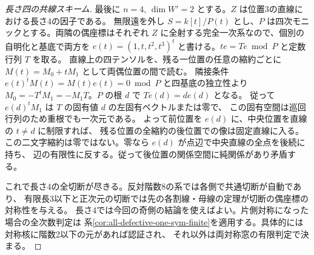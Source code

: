 \begin{proof}[長さ四の共線スキーム]
最後に $n=4$, $\dim W'=2$ とする。$Z$ は位置3の直線における長さ4の因子である。
無限遠を外し $S=k[t]/P(t)$ とし、$P$ は四次モニックとする。両隣の偶座標はそれぞれ
$Z$ に全射する完全一次系なので、個別の自明化と基底で両方を
$e(t)=(1,t,t^2,t^3)^t$ と書ける。$t e=T e\bmod P$ と定数行列 $T$ を取る。
直線上の四テンソルを、残る一位置の任意の縮約ごとに $M(t)=M_0+tM_1$ として両偶位置の間で読む。
隣接条件 $e(t)^t M(t)=M(t)e(t)=0\bmod P$ と四基底の独立性より
$M_0=-T^t M_1=-M_1T$。$P$ の根 $d$ で $Te(d)=d e(d)$ となる。
従って $e(d)^t M_1$ は $T$ の固有値 $d$ の左固有ベクトルまたは零で、
この固有空間は巡回行列のため重根でも一次元である。
よって前位置を $e(d)$ に、中央位置を直線の $t\ne d$ に制限すれば、
残る位置の全縮約の後位置での像は固定直線に入る。
この二文字縮約は零ではない。零なら $e(d)$ が点辺で中央直線の全点を後続に持ち、
辺の有限性に反する。従って後位置の関係空間に純関係があり矛盾する。

これで長さ4の全切断が尽きる。反対階数8の系では各側で共通切断が自動であり、
有限長3以下と正次元の切断では先の各割線・母線の定理が切断の偶座標の対称性を与える。
長さ4では今回の奇側の結論を使えばよい。片側対称になった場合の全次数判定は
系\ref{cor:all-defective-one-sym-finite}を適用する。具体的には対称核に階数2以下の元があれば認証され、
それ以外は両対称窓の有限判定で決まる。
\end{proof}
